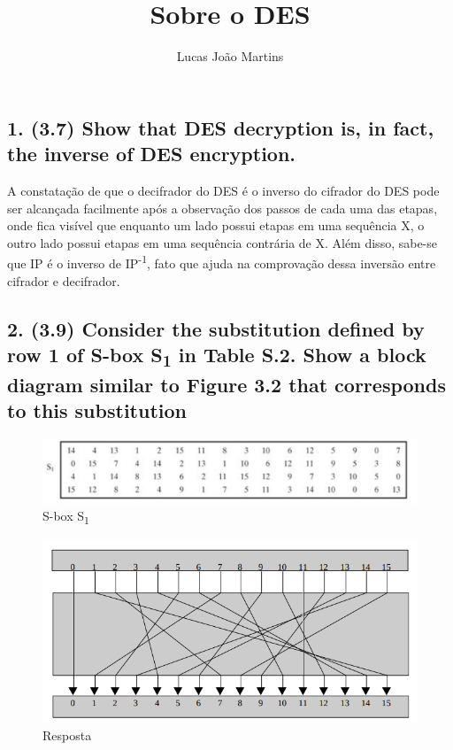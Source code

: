\documentclass[12pt]{article}
\title{Sobre o DES}
\author{Lucas João Martins}
\date{}
\begin{document}
\maketitle

\section*{}
\subsection*{1. (3.7) Show that DES decryption is, in fact, the inverse of DES
encryption.}

  A constatação de que o decifrador do DES é o inverso do cifrador do DES pode
  ser alcançada facilmente após a observação dos passos de cada uma das etapas,
  onde fica visível que enquanto um lado possui etapas em uma sequência X, o
  outro lado possui etapas em uma sequência contrária de X. Além disso, sabe-se
  que IP é o inverso de IP\textsuperscript{-1}, fato que ajuda na comprovação
  dessa inversão entre cifrador e decifrador.

\subsection*{2. (3.9) Consider the substitution defined by row 1 of S-box
S\textsubscript{1} in Table S.2. Show a block diagram similar to Figure 3.2 that
corresponds to this substitution}

  \begin{figure}[h]
    \includegraphics[width=\linewidth]{des_block_substitution}
    \caption{S-box S\textsubscript{1}}
  \end{figure}

  \begin{figure}[h]
    \includegraphics[width=\linewidth]{des_block_diagram}
    \caption{Resposta}
  \end{figure}
\end{document}
